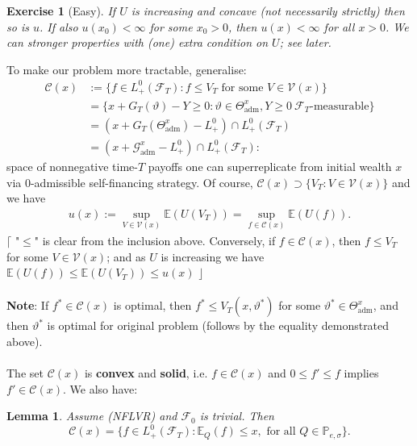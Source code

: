 \documentclass[12pt,a4paper, twoside]{article}
\newtheorem{lem}{Lemma}[section]
\newtheorem{exe}{Exercise}[section]
\theoremstyle{definition}
\newcommand{\EE}{\mathbb{E}} %
\newcommand{\PP}{\mathbb{P}} %
\begin{document}
\begin{exe}[Easy] If $U$ is increasing and concave (not necessarily strictly) then so is $u$. If also $u(x_0) < \infty$ for some $x_0>0$, then $u(x) < \infty$ for all $x>0$. We can stronger properties with (one) extra condition on $U$; see later. 
\end{exe}
To make our problem more tractable, generalise: 
\begin{align*}
\mathcal{C}(x)&:= \{ f \in L_+^0( \mathcal{F}_T): f \leq V_T \text{ for some } V \in \mathcal{V}(x) \} \\
&= \{ x + G_T( \vartheta)- Y \geq 0 : \vartheta \in \Theta_\text{adm}^x, Y \geq 0 \ \mathcal{F}_T\text{-measurable}\} \\
&= (x + G_T( \Theta_\text{adm}^x) - L_+^0) \cap L_+^0( \mathcal{F}_T)  \\
&= (x + \mathcal{G}_\text{adm}^x-L_+^0) \cap L_+^0 ( \mathcal{F}_T):
\end{align*}
space of nonnegative time-$T$ payoffs one can superreplicate from initial wealth $x$ via $0$-admissible self-financing strategy. \newpage
 Of course, $\mathcal{C}(x) \supset \{ V_T : V \in \mathcal{V}(x)\}$ and we have 
 \begin{align*}
 u(x):= \sup_{V \in \mathcal{V}(x)} \EE(U(V_T)) = \sup_{f \in \mathcal{C}(x)} \EE(U(f)).
 \end{align*}
$\lceil$ "$\leq$" is clear from the inclusion above. Conversely, if $f \in \mathcal{C}(x)$, then $f \leq V_T$ for some $V \in \mathcal{V}(x)$; and as $U$ is increasing we have $\EE(U(f)) \leq \EE(U(V_T)) \leq u(x)$ \hfill $\rfloor$
\\\\
\textbf{Note}: If $f^* \in \mathcal{C}(x)$ is optimal, then $f^* \leq V_T( x, \vartheta^*)$ for some $\vartheta^* \in \Theta_\text{adm}^x$, and then $\vartheta^*$ is optimal for original problem (follows by the equality demonstrated above). 
\\\\
The set $\mathcal{C}(x)$ is \textbf{convex} and \textbf{solid}, i.e. $f \in \mathcal{C}(x)$ and $0 \leq f' \leq f$ implies $f' \in \mathcal{C}(x)$. We also have:
\begin{lem} \label{L101} Assume (NFLVR) and $\mathcal{F}_0$ is trivial. Then $$\mathcal{C}(x) = \{ f \in L_+^0( \mathcal{F}_T) : \EE_Q(f) \leq x, \text{ for all } Q \in \PP_{e, \sigma}\}.$$
\end{lem}
\end{document}

